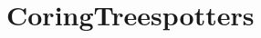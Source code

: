 \chapter{CoringTreespotters}
\label{ch:CoringTreespotters}


\newcommand{\Arub}{\textit{A. rubrum}}
\newcommand{\Asac}{\textit{A. saccharum}}
\newcommand{\Afla}{\textit{A. flava}}
\newcommand{\Bnig}{\textit{B. nigra}}
\newcommand{\Cgla}{\textit{C. glabra}}
\newcommand{\Cova}{\textit{C. ovata}}
\newcommand{\Pdel}{\textit{P. deltoides}}
\newcommand{\Qalb}{\textit{Q. alba}}
\newcommand{\Qrub}{\textit{Q. rubra}}
\newcommand{\Tame}{\textit{T. americana}}   





